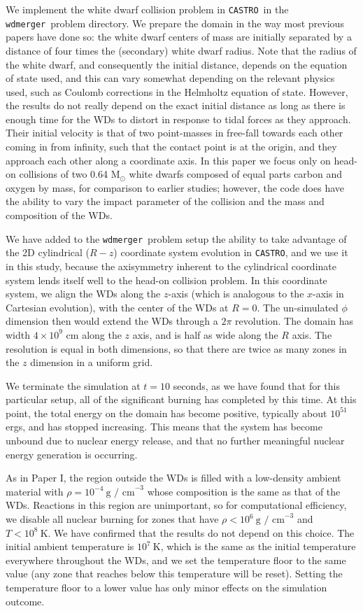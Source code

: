 \documentclass[twocolumn,numberedappendix]{../aastex6}
\newcommand{\msolar}{\mathrm{M}_\odot}
\newcommand{\castro}{\texttt{CASTRO}}
\newcommand{\wdmerger}{\texttt{wdmerger}}
\begin{document}
We implement the white dwarf collision problem in \castro\ in the \wdmerger\ problem
directory. We prepare the domain in the way most previous papers have done so:
the white dwarf centers of mass are initially separated by a distance of four times
the (secondary) white dwarf radius. Note that the radius of the white dwarf, and
consequently the initial distance, depends on the equation of state used, and this
can vary somewhat depending on the relevant physics used, such as Coulomb corrections
in the Helmholtz equation of state. However, the results do not really depend on the
exact initial distance as long as there is enough time for the WDs to distort in
response to tidal forces as they approach. Their initial velocity is that of
two point-masses in free-fall towards each other coming in from infinity, such that
the contact point is at the origin, and they approach each other along a coordinate axis.
In this paper we focus only on head-on collisions of two 0.64 $\msolar$ white dwarfs
composed of equal parts carbon and oxygen by mass, for comparison to earlier studies;
however, the code does have the ability to vary the impact parameter of the collision
and the mass and composition of the WDs.

We have added to the \wdmerger\ problem setup the ability to take advantage of 
the 2D cylindrical ($R-z$) coordinate system evolution in \castro, and we use it
in this study, because the axisymmetry inherent to the cylindrical coordinate system
lends itself well to the head-on collision problem. In this coordinate system, we
align the WDs along the $z$-axis (which is analogous to the $x$-axis in Cartesian
evolution), with the center of the WDs at $R = 0$. The un-simulated $\phi$ dimension
then would extend the WDs through a $2\pi$ revolution. The domain has width $4 \times 10^{9}$
cm along the $z$ axis, and is half as wide along the $R$ axis. The resolution is equal
in both dimensions, so that there are twice as many zones in the $z$ dimension in
a uniform grid.

We terminate the simulation at $t = 10$ seconds, as we have found that for this
particular setup, all of the significant burning has completed by this time. At
this point, the total energy on the domain has become positive, typically about
$10^{51}$ ergs, and has stopped increasing. This means that the system has become
unbound due to nuclear energy release, and that no further meaningful nuclear energy
generation is occurring.

As in Paper I, the region outside the WDs is filled with a low-density ambient
material with $\rho = 10^{-4}\ \text{g / cm}^{-3}$ whose composition is the
same as that of the WDs. Reactions in this region are unimportant, so for
computational efficiency, we disable all nuclear burning for zones that have
$\rho < 10^6\ \text{g / cm}^{-3}$ and $T < 10^8\ \text{K}$. We have confirmed that
the results do not depend on this choice. The initial ambient
temperature is $10^7\ \text{K}$, which is the same as the initial temperature
everywhere throughout the WDs, and we set the temperature floor to the same
value (any zone that reaches below this temperature will be reset). Setting the
temperature floor to a lower value has only minor effects on the simulation outcome.
\end{document}
